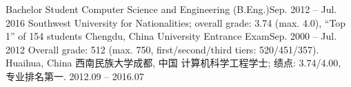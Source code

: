
 {
    \resumeSubheading
      {Bachelor Student Computer Science and Engineering (B.Eng.)}{Sep. 2012 -- Jul. 2016}
      {Southwest University for Nationalities; overall grade: 3.74 (max. 4.0), ``Top 1'' of 154 students
      }{Chengdu, China}
      \resumeItemListStart
    \resumeItemListEnd
    \resumeSubheading
      {University Entrance Exam}{Sep. 2000 -- Jul. 2012}
      {Overall grade: 512 (max. 750, first/second/third tiers: 520/451/357).
      }{Huaihua, China}
}{
  \resumeSubheading
    {西南民族大学}{成都, 中国}
    {计算机科学工程学士; 绩点: 3.74/4.00, 专业排名第一.
    }{2012.09 -- 2016.07}
}





\resumeSubHeadingListEnd